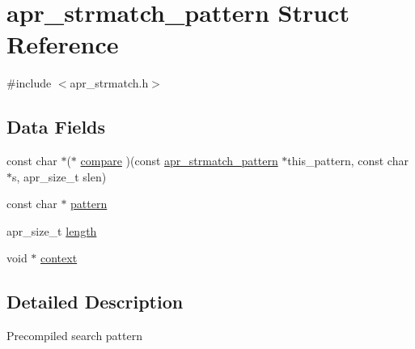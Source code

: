 \hypertarget{structapr__strmatch__pattern}{\section{apr\-\_\-strmatch\-\_\-pattern Struct Reference}
\label{structapr__strmatch__pattern}
}


{\ttfamily \#include $<$apr\-\_\-strmatch.\-h$>$}

\subsection*{Data Fields}
\begin{DoxyCompactItemize}
\item 
const char $\ast$($\ast$ \hyperlink{structapr__strmatch__pattern_a722ba7f187cc179ac5fe0b306b8f9624}{compare} )(const \hyperlink{structapr__strmatch__pattern}{apr\-\_\-strmatch\-\_\-pattern} $\ast$this\-\_\-pattern, const char $\ast$s, apr\-\_\-size\-\_\-t slen)
\item 
const char $\ast$ \hyperlink{structapr__strmatch__pattern_ad219bd7708d7be5937cb79e7cfda01c0}{pattern}
\item 
apr\-\_\-size\-\_\-t \hyperlink{structapr__strmatch__pattern_a4b1f44db089850f396bc4bedac0fb25c}{length}
\item 
void $\ast$ \hyperlink{structapr__strmatch__pattern_a0e74c401e8825e462e202175bf033a9c}{context}
\end{DoxyCompactItemize}


\subsection{Detailed Description}
Precompiled search pattern 


